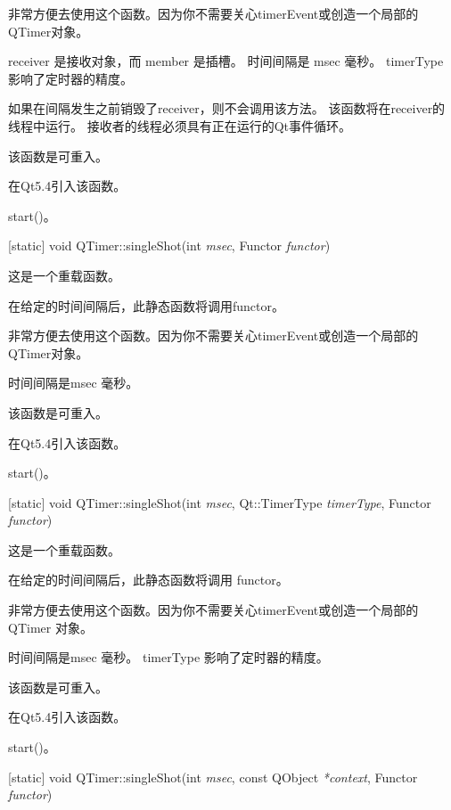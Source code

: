 非常方便去使用这个函数。因为你不需要关心timerEvent或创造一个局部的QTimer对象。

receiver 是接收对象，而 member 是插槽。 时间间隔是 msec 毫秒。 timerType 影响了定时器的精度。

如果在间隔发生之前销毁了receiver，则不会调用该方法。 该函数将在receiver的线程中运行。 接收者的线程必须具有正在运行的Qt事件循环。

\begin{notice}
该函数是可重入。
\end{notice}

在Qt5.4引入该函数。

\begin{notice}[另请参阅]
start()。
\end{notice}

[static] void QTimer::singleShot(int \emph{msec}, Functor \emph{functor})

这是一个重载函数。

在给定的时间间隔后，此静态函数将调用functor。

非常方便去使用这个函数。因为你不需要关心timerEvent或创造一个局部的QTimer对象。

时间间隔是msec 毫秒。

\begin{notice}
该函数是可重入。
\end{notice}

在Qt5.4引入该函数。

\begin{notice}[另请参阅]
start()。
\end{notice}

[static] void QTimer::singleShot(int \emph{msec}, Qt::TimerType \emph{timerType}, Functor \emph{functor})

这是一个重载函数。

在给定的时间间隔后，此静态函数将调用 functor。

非常方便去使用这个函数。因为你不需要关心timerEvent或创造一个局部的 QTimer 对象。

时间间隔是msec 毫秒。 timerType 影响了定时器的精度。

\begin{notice}
该函数是可重入。
\end{notice}
	

在Qt5.4引入该函数。

\begin{notice}[另请参阅]
start()。
\end{notice}

[static] void QTimer::singleShot(int \emph{msec}, const QObject \emph{*context}, Functor \emph{functor})

